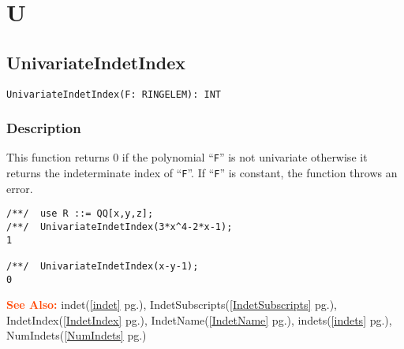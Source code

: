 \documentclass[a4paper]{mybook}
\newenvironment{command}{}{} %
\newcommand\SeeAlso{\par\textcolor{OrangeRed}{\textbf{\large See Also: }}}
\begin{document}
\chapter{U}  %
\label{U}

\section{UnivariateIndetIndex}
\label{UnivariateIndetIndex}
\begin{command} %


\begin{Verbatim}[label=syntax, rulecolor=\color{MidnightBlue},
frame=single]
UnivariateIndetIndex(F: RINGELEM): INT
\end{Verbatim}


\subsection*{Description}

This function returns 0 if the polynomial ``\verb&F&'' is not univariate
otherwise it returns the indeterminate index of ``\verb&F&''.  If ``\verb&F&'' is
constant, the function throws an error.
\begin{Verbatim}[label=example, rulecolor=\color{PineGreen}, frame=single]
/**/  use R ::= QQ[x,y,z];
/**/  UnivariateIndetIndex(3*x^4-2*x-1);
1

/**/  UnivariateIndetIndex(x-y-1);
0
\end{Verbatim}



\SeeAlso %
  indet(\ref{indet} pg.\pageref{indet}), 
    IndetSubscripts(\ref{IndetSubscripts} pg.\pageref{IndetSubscripts}), 
    IndetIndex(\ref{IndetIndex} pg.\pageref{IndetIndex}), 
    IndetName(\ref{IndetName} pg.\pageref{IndetName}), 
    indets(\ref{indets} pg.\pageref{indets}), 
    NumIndets(\ref{NumIndets} pg.\pageref{NumIndets})
\end{command} %
\end{document}
